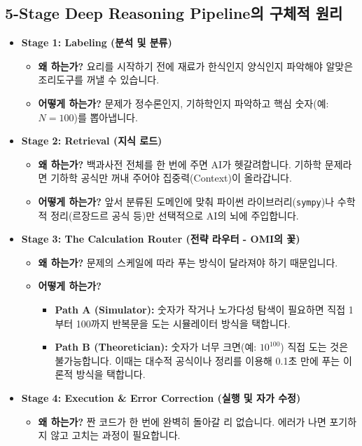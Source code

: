 \documentclass[11pt,a4paper]{article}
\begin{document}
\subsection{5-Stage Deep Reasoning Pipeline의 구체적 원리}
\begin{itemize}
    \item \textbf{Stage 1: Labeling (분석 및 분류)}
    \begin{itemize}
        \item \textbf{왜 하는가?} 요리를 시작하기 전에 재료가 한식인지 양식인지 파악해야 알맞은 조리도구를 꺼낼 수 있습니다.
        \item \textbf{어떻게 하는가?} 문제가 정수론인지, 기하학인지 파악하고 핵심 숫자(예: $N=100$)를 뽑아냅니다.
    \end{itemize}
    \item \textbf{Stage 2: Retrieval (지식 로드)}
    \begin{itemize}
        \item \textbf{왜 하는가?} 백과사전 전체를 한 번에 주면 AI가 헷갈려합니다. 기하학 문제라면 기하학 공식만 꺼내 주어야 집중력(Context)이 올라갑니다.
        \item \textbf{어떻게 하는가?} 앞서 분류된 도메인에 맞춰 파이썬 라이브러리(\texttt{sympy})나 수학적 정리(르장드르 공식 등)만 선택적으로 AI의 뇌에 주입합니다.
    \end{itemize}
    \item \textbf{Stage 3: The Calculation Router (전략 라우터 - OMI의 꽃)}
    \begin{itemize}
        \item \textbf{왜 하는가?} 문제의 스케일에 따라 푸는 방식이 달라져야 하기 때문입니다.
        \item \textbf{어떻게 하는가?} 
        \begin{itemize}
            \item \textbf{Path A (Simulator):} 숫자가 작거나 노가다성 탐색이 필요하면 직접 1부터 100까지 반복문을 도는 시뮬레이터 방식을 택합니다.
            \item \textbf{Path B (Theoretician):} 숫자가 너무 크면(예: $10^{100}$) 직접 도는 것은 불가능합니다. 이때는 대수적 공식이나 정리를 이용해 0.1초 만에 푸는 이론적 방식을 택합니다.
        \end{itemize}
    \end{itemize}
    \item \textbf{Stage 4: Execution \& Error Correction (실행 및 자가 수정)}
    \begin{itemize}
        \item \textbf{왜 하는가?} 짠 코드가 한 번에 완벽히 돌아갈 리 없습니다. 에러가 나면 포기하지 않고 고치는 과정이 필요합니다.

\end{itemize}
\end{itemize}
\end{document}

